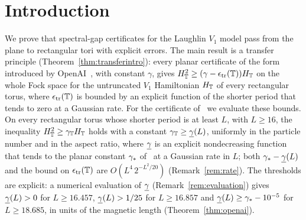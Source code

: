 \section{Introduction}\label{sec:intro}

We prove that spectral-gap certificates for the Laughlin $V_1$ model pass from the plane to rectangular tori with explicit
errors. The main result is a transfer principle (Theorem~\ref{thm:transferintro}): every planar certificate of the form introduced
by OpenAI~\cite{OAI:A-Fock-space-inequality-and-the-Laughlin-spectral-gap-September-24-2026}, with constant $\gamma$, gives
$H_{\mathbb{T}}^2\ge(\gamma-\epsilon_{\mathrm{tr}}(\mathbb{T}))H_{\mathbb{T}}$ on the whole Fock space for the untruncated $V_1$ Hamiltonian $H_{\mathbb{T}}$ of every rectangular
torus, where $\epsilon_{\mathrm{tr}}(\mathbb{T})$ is bounded by an explicit function of the shorter period that tends to zero at a Gaussian rate. For
the certificate of~\cite{OAI:A-Fock-space-inequality-and-the-Laughlin-spectral-gap-September-24-2026} we evaluate these bounds.
On every rectangular torus whose shorter period is at least $L$, with $L\ge16$, the inequality $H_{\mathbb{T}}^2\ge\gamma_{\mathbb{T}}H_{\mathbb{T}}$ holds with a
constant $\gamma_{\mathbb{T}}\ge\underline{\gamma}(L)$, uniformly in the particle number and in the aspect ratio, where $\underline{\gamma}$ is an explicit nondecreasing
function that tends to the planar constant $\gamma_{*}$
of~\cite{OAI:A-Fock-space-inequality-and-the-Laughlin-spectral-gap-September-24-2026} at a Gaussian rate in $L$; both
$\gamma_{*}-\underline{\gamma}(L)$ and the bound on $\epsilon_{\mathrm{tr}}(\mathbb{T})$ are $O(L^4\,2^{-L^2/20})$ (Remark~\ref{rem:rate}).
The thresholds are explicit: a numerical evaluation of $\underline{\gamma}$ (Remark~\ref{rem:evaluation}) gives $\underline{\gamma}(L)>0$ for $L\ge16.457$,
$\underline{\gamma}(L)>1/25$ for $L\ge16.857$ and $\underline{\gamma}(L)\ge\gamma_{*}-10^{-5}$ for $L\ge18.685$, in units of the magnetic length
(Theorem~\ref{thm:openai}).

